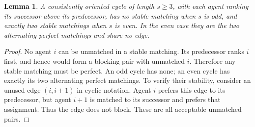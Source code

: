 \documentclass[11pt]{article}
\newtheorem{lemma}[theorem]{Lemma}
\theoremstyle{definition}
\begin{document}
\begin{lemma}
A consistently oriented cycle of length $s\ge3$, with each agent ranking
its successor above its predecessor, has no stable matching when $s$ is
odd, and exactly two stable matchings when $s$ is even. In the even case
they are the two alternating perfect matchings and share no edge.
\end{lemma}
\begin{proof}
No agent $i$ can be unmatched in a stable matching. Its predecessor ranks
$i$ first, and hence would form a blocking pair with unmatched $i$.
Therefore any stable matching must be perfect. An odd cycle has none;
an even cycle has exactly its two alternating perfect matchings.
To verify their stability, consider an unused edge $(i,i+1)$ in cyclic
notation. Agent $i$ prefers this edge to its predecessor, but agent $i+1$
is matched to its successor and prefers that assignment. Thus the edge
does not block. These are all acceptable unmatched pairs.
\end{proof}
\end{document}
